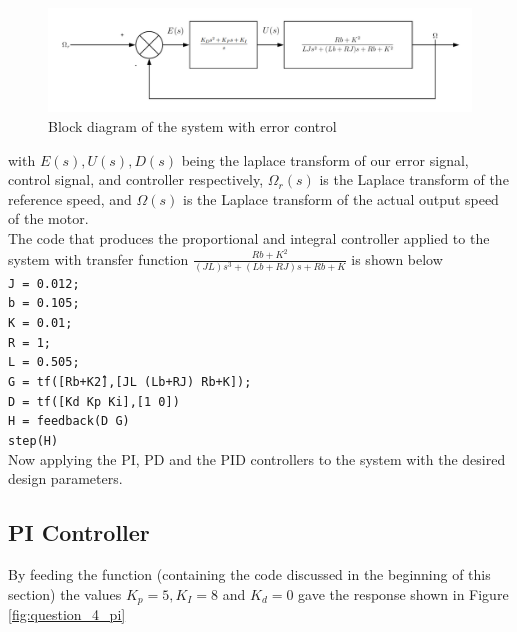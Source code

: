 \documentclass[a4paper, 12pt]{article}
\begin{document}
\begin{figure}[H]
  \centering
  \includegraphics[width=\textwidth]{Images/Block_Diagram_Question_4.png}
  \caption{Block diagram of the system with error control}
  \label{fig:block_diagram_question_4}
\end{figure}

with $E(s), U(s), D(s)$ being the laplace transform of our error signal,
control signal, and controller respectively, $\Omega_r(s)$ is the Laplace
transform of the reference speed, and $\Omega(s)$ is the Laplace transform of
the actual output speed of the motor.
\\

The code that produces the proportional and integral controller applied to the
system with transfer function $\frac{Rb+K^2}{(JL)s^3+(Lb+RJ)s+Rb+K}$ is shown
below \\ 

\noindent
\texttt{J = 0.012;}\\
\texttt{b = 0.105;}\\
\texttt{K = 0.01;}\\
\texttt{R = 1;}\\
\texttt{L = 0.505;}\\
\texttt{G = tf([R\*b+K\^2],[J\*L (L\*b+R\*J) R\*b+K]);}\\
\texttt{D = tf([Kd Kp Ki],[1 0])}\\
\texttt{H = feedback(D \* G)}\\
\texttt{step(H)}\\

Now applying the PI, PD and the PID controllers to the system with the desired design parameters.

\subsection{PI Controller} %
\label{sub:pi_controller}
By feeding the function (containing the code discussed in the beginning of this section) the values $K_p = 5, K_I = 8$ and $K_d = 0$ gave the response shown in Figure \ref{fig:question_4_pi}
\end{document}
